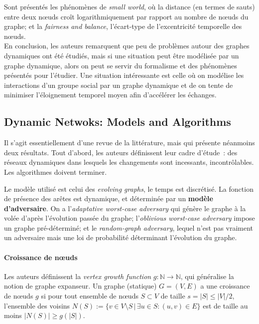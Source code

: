 \documentclass[12pt,a4paper]{article}
\begin{document}
Sont présentés les phénomènes de \textit{small world}, où la distance
(en termes de sauts) entre deux nœuds croît logarithmiquement par
rapport au nombre de nœuds du graphe; et la \textit{fairness and
  balance}, l'écart-type de l'excentricité temporelle des nœuds.\\

En conclusion, les auteurs remarquent que peu de problèmes autour des
graphes dynamiques ont été étudiés, mais si une situation peut être
modélisée par un graphe dynamique, alors on peut se servir du
formalisme et des phénomènes présentés pour l'étudier. Une situation
intéressante est celle où on modélise les interactions d'un groupe
social par un graphe dynamique et de on tente de minimiser
l'éloignement temporel moyen afin d'accélérer les échanges.

\subsection{Dynamic Netwoks: Models and
  Algorithms~\cite{kuhn2011dynamic}}

Il s'agit essentiellement d'une revue de la littérature, mais qui
présente néanmoins deux résultats. Tout d'abord, les auteurs
définissent leur cadre d'étude~: des réseaux dynamiques dans lesquels
les changements sont incessants, incontrôlables. Les algorithmes
doivent terminer.

Le modèle utilisé est celui des \textit{evolving graphs}, le temps est
discrétisé. La fonction de présence des arêtes est dynamique, et
déterminée par un \textbf{modèle d'adversaire}. On a
l'\textit{adaptative worst-case adversary} qui génère le graphe à la
volée d'après l'évolution passée du graphe; l'\textit{oblivious
  worst-case adversary} impose un graphe pré-déterminé; et le
\textit{random-graph adversary}, lequel n'est pas vraiment un
adversaire mais une loi de probabilité déterminant l'évolution du
graphe.

\paragraph{Croissance de nœuds} Les auteurs définissent la
\textit{vertex growth function} \(g : \mathbb{N} \to \mathbb{N}\), qui
généralise la notion de graphe expanseur. Un graphe (statique)
\(G = (V, E)\) a une croissance de nœuds \(g\) si pour tout ensemble
de nœuds \(S \subset V\) de taille \(s = |S| \leq |V|/2\), l'ensemble
des voisins
\(N(S) := \{v \in V \setminus S \,|\, \exists u \in S : (u, v) \in
E\}\) est de taille au moins \(|N(S)| \geq g(|S|)\).
\end{document}

